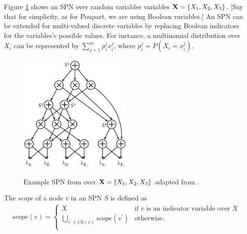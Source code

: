 %
%

Figure \ref{fig:spn} shows an SPN over random variables variables ${\bf X}=\{X_1,X_2,X_3\}$.
[Say that for simplicity, as for Poupart, we are using Boolean variables.]
An SPN can be extended for multi-valued discrete variables by replacing Boolean indicators for the variables's possible values.
For instance, a multinomial distribution over $X_i$ can be represented by $\sum_{j=1}^{m}{p^j_i x^j_i}$, where $p^j_i = P(X_i = x^j_i)$.


\begin{figure}[h]
    \begin{center}
		\includegraphics[width=0.5\textwidth]{figures/SPN.png}
		\caption{Example SPN from over ${\bf X}=\{X_1,X_2,X_3\}$ adapted from \cite{Peharz:2016wl}.}
		\label{fig:spn}
    \label{fig:spn}
    \end{center}
\end{figure}

%

The \emph{scope} of a node $v$ in an SPN $S$ is defined as
\begin{align*}
scope(v) = \begin{cases}
				X & \text{if $v$ is an indicator variable over $X$}\\
				\bigcup_{v^\prime \in Ch(v)}{scope(v^\prime)} &\text{otherwise.}\\
			\end{cases}
\end{align*}

